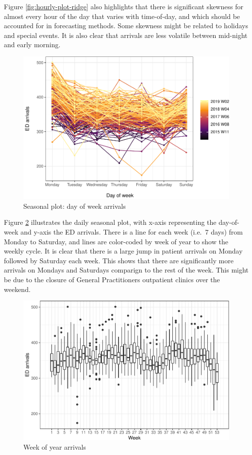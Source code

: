 \documentclass[]{elsarticle} %
\begin{document}
Figure \ref{fig:hourly-plot-ridge} also highlights that there is significant skewness for almost every hour of the day that varies with time-of-day, and which should be accounted for in forecasting methods. Some skewness might be related to holidays and special events. It is also clear that arrivals are less volatile between mid-night and early morning.

\begin{figure}[H]

{\centering \includegraphics[width=0.7\linewidth]{paper_files/figure-latex/seasonplot-dofw-1} 

}

\caption{Seasonal plot: day of week arrivals}\label{fig:seasonplot-dofw}
\end{figure}

Figure \ref{fig:seasonplot-weekofyear} illustrates the daily seasonal plot, with x-axis representing the day-of-week and y-axis the ED arrivals. There is a line for each week (i.e.~7 days) from Monday to Saturday, and lines are color-coded by week of year to show the weekly cycle. It is clear that there is a large jump in patient arrivals on Monday followed by Saturday each week. This shows that there are significantly more arrivals on Mondays and Saturdays comparign to the rest of the week. This might be due to the closure of General Practitioners outpatient clinics over the weekend.

\begin{figure}[H]

{\centering \includegraphics[width=0.7\linewidth]{paper_files/figure-latex/seasonplot-weekofyear-1} 

}

\caption{Week of year arrivals}\label{fig:seasonplot-weekofyear}
\end{figure}
\end{document}
